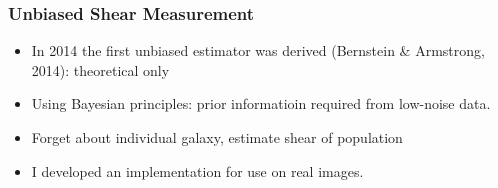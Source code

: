 \documentclass{beamer}
\begin{document}
\frame
{
    \frametitle{Unbiased Shear Measurement}

 
    \begin{itemize}

        \item In 2014 the first unbiased estimator was derived (Bernstein \&
            Armstrong, 2014):  theoretical only

        \item Using Bayesian principles: prior informatioin required from
            low-noise data.

        \item Forget about individual galaxy, estimate shear of population

        \item I developed an implementation for use on real images.


    \end{itemize}
}
\end{document}
